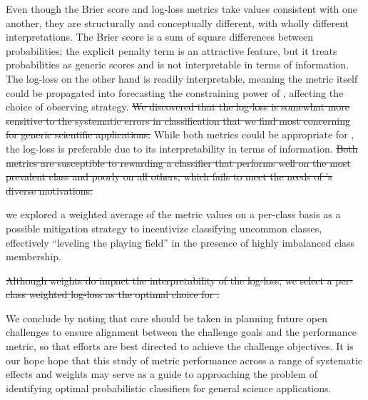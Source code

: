 Even though the Brier score and log-loss metrics take values consistent with one another, they are structurally and conceptually different, with wholly different interpretations.
The Brier score is a sum of square differences between probabilities; the explicit penalty term is an attractive feature, but it treats probabilities as generic scores and is not interpretable in terms of information.
The log-loss on the other hand is readily interpretable, meaning the metric itself could be propagated into forecasting the constraining power of \lsst, affecting the choice of observing strategy.
\sout{We discovered that the log-loss is somewhat more sensitive to the systematic errors in classification that we find most concerning for generic scientific applications.}
While both metrics could be appropriate for \plasticc, the log-loss is preferable due to its interpretability in terms of information.
\sout{Both metrics are susceptible to rewarding a classifier that performs well on the most prevalent class and poorly on all others, which fails to meet the needs of \plasticc's diverse motivations.}

 we explored a weighted average of the metric values on a per-class basis as a possible mitigation strategy to incentivize classifying uncommon classes, effectively ``leveling the playing field'' in the presence of highly imbalanced class membership. %

\sout{Although weights do impact the interpretability of the log-loss, we select a per-class weighted log-loss as the optimal choice for \plasticc.}

We conclude by noting that care should be taken in planning future open challenges to ensure alignment between the challenge goals and the performance metric, so that efforts are best directed to achieve the challenge objectives.
It is our hope hope that this study of metric performance across a range of systematic effects and weights may serve as a guide to approaching the problem of identifying optimal probabilistic classifiers for general science applications.
